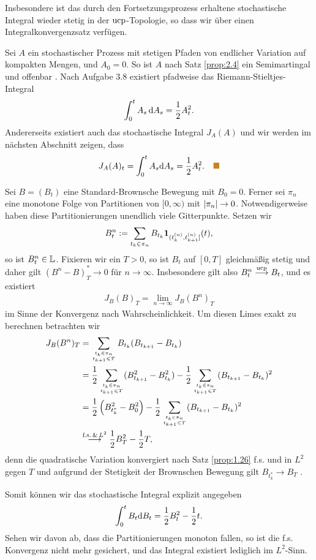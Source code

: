 Insbesondere ist das durch den Fortsetzungsprozess erhaltene stochastische
Integral wieder stetig in der $\text{ucp}$-Topologie, so dass wir über einen
Integralkonvergenzsatz verfügen.

\begin{ex}
Sei $A$ ein stochastischer Prozess mit stetigen Pfaden von endlicher Variation
auf kompakten Mengen, und $A_0 = 0$. So ist $A$ nach Satz \ref{prop:2.4} ein
Semimartingal und offenbar \caglad. Nach Aufgabe 3.8 existiert pfadweise
das Riemann-Stieltjes-Integral
\begin{align*}
\int_0^t A_s\, \mathrm{d} A_s = \frac{1}{2}A_t^2.
\end{align*}
Andererseits existiert auch das stochastische Integral $J_A(A)$ und wir werden
im nächsten Abschnitt zeigen, dass
\begin{align*}
J_A(A)_t = \int_0^t A_s \dA_s = \frac{1}{2}A_t^2.\bsp 
\end{align*}
\end{ex}

\begin{ex}
Sei $B = (B_t)$ eine Standard-Brownsche Bewegung mit $B_0 = 0$. Ferner sei
$\pi_n$ eine monotone Folge von Partitionen von $[0,\infty)$ mit
$\lvert\pi_n\rvert\to 0$. Notwendigerweise haben diese Partitionierungen
unendlich viele Gitterpunkte. Setzen wir
\begin{align*}
B_t^n := \sum_{t_k \in \pi_n} B_{t_k}\mathbf{1}_{(t_k^{(n)},t_{k+1}^{(n)}]}(t),
\end{align*}
so ist $B_t^n\in \mathbb{L}$. Fixieren wir ein $T > 0$, so ist
$B_t$ auf $[0,T]$ gleichmäßig stetig und daher gilt $(B^n-B)_T^* \to 0$ \fs
für $n\to \infty$. Insbesondere gilt also $B_t^n \overset{\text{ucp}}{\longrightarrow} B_t$, und es existiert
\begin{align*}
J_B(B)_T = \lim\limits_{n\to \infty} J_B(B^n)_T
\end{align*}
im Sinne der Konvergenz nach Wahrscheinlichkeit. Um diesen Limes exakt zu
berechnen betrachten wir
\begin{align*}
J_B(B^n)_T &= \sum_{\atop{t_k\in \pi_n}{t_{k+1}\le T}}
B_{t_k}(B_{t_{k+1}}-B_{t_k})\\
&= \frac{1}{2}\sum_{\atop{t_k\in \pi_n}{t_{k+1}\le T}}
(B_{t_{k+1}}^2-B_{t_k}^2)
-
\frac{1}{2}\sum_{\atop{t_k\in \pi_n}{t_{k+1}\le T}}
(B_{t_{k+1}}-B_{t_k})^2\\
&= \frac{1}{2}\left(B_{t_k^*}^2 - B_0^2 \right)
- \frac{1}{2}\sum_{\atop{t_k\in \pi_n}{t_{k+1}\le T}}
(B_{t_{k+1}}-B_{t_k})^2\\
&\overset{\fs\, \&\, L^2}{\longto} \frac{1}{2} B_T^2 - \frac{1}{2}T,
\end{align*}
denn die quadratische Variation konvergiert nach
Satz \ref{prop:1.26} f.s. und in $L^2$ gegen $T$ und
aufgrund der Stetigkeit der Brownschen Bewegung gilt $B_{t_k^*}\to B_{T}$ .

Somit können wir das stochastische Integral explizit angegeben
\begin{align*}
\int_0^t B_t \mathrm{d} B_t = \frac{1}{2}B_t^2 - \frac{1}{2}t.
\end{align*}
Sehen wir davon ab, dass die Partitionierungen monoton fallen, so ist die f.s.
Konvergenz nicht mehr gesichert, und das Integral existiert lediglich im
$L^2$-Sinn.
\bsp
\end{ex}

